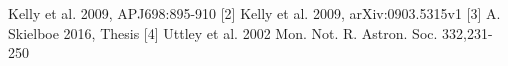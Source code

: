 \documentclass[twocolumn]{article}
\begin{document}
\newpage
[1] Kelly et al. 2009, APJ698:895-910 
[2] Kelly et al. 2009, arXiv:0903.5315v1 
[3] A. Skielboe 2016, Thesis 
[4] Uttley et al. 2002 Mon. Not. R. Astron. Soc. 332,231-250

\end{document}
